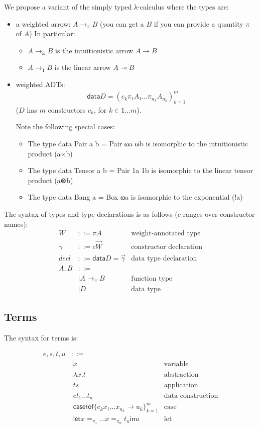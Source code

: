 \documentclass[11pt]{article}
\newcommand{\case}[2]{\mathsf{case} #1 \mathsf{of} \{#2\}^m_{k=1}}
\newcommand{\flet}[1][]{\mathsf{let}_{#1} }
\newcommand{\fin}{ \mathsf{in} }
\begin{document}
We propose a variant of the simply typed λ-calculus where the types
are:

\begin{itemize}
\item a weighted arrow: \(A →_π B\) (you can get a \(B\) if you can provide a
quantity \(π\) of \(A\))
In particular:
\begin{itemize}
\item \(A →_ω B\) is the intuitionistic arrow \(A → B\)
\item \(A →_1 B\) is the linear arrow \(A ⊸ B\)
\end{itemize}
\item weighted ADTs:
\begin{align*}
\mathsf{data} D = (c_k  π₁ A₁  …  π_{n_k} A_{n_k})^m_{k=1}
\end{align*}
(\(D\) has \(m\) constructors \(c_k\), for \(k ∈ 1…m\)).

Note the following special cases:
\begin{itemize}
\item The type data Pair a b = Pair ωa ωb is isomorphic to the intuitionistic product (a×b)
\item The type data Tensor a b = Pair 1a 1b is isomorphic to the linear tensor product (a⊗b)
\item The type data Bang a = Box ωa is isomorphic to the exponential (!a)
\end{itemize}
\end{itemize}

The syntax of types and type declarations is as follows ($c$ ranges over constructor names):
\begin{align*}
  W &::= πA &\text{weight-annotated type}\\
  γ &::= c  \vec{W}&\text{constructor declaration}\\
  decl &::= \mathsf{data } D = \vec{γ}&\text{data type declaration}\\
  A,B &::=\\
      & |  A →_π B &\text{function type}\\
      & |  D &\text{data type}
\end{align*}

\subsection{Terms}
\label{sec:orgheadline3}

The syntax for terms is:

\begin{align*}
e,s,t,u & ::= \\
    & |  x & \text{variable} \\
    & |  λx. t & \text{abstraction} \\
    & |  t s & \text{application} \\
    & |  c t₁ … t_n & \text{data construction} \\
    & |  \case t {c_k  x₁ … x_{n_k} → u_k}  & \text{case} \\
    & |  \flet x =_{π₁} … x =_{π_n} t_n \fin u & \text{let}
\end{align*}
\end{document}
